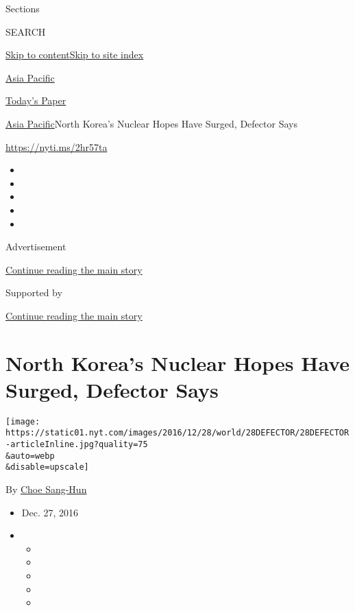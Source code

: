 Sections

SEARCH

\protect\hyperlink{site-content}{Skip to
content}\protect\hyperlink{site-index}{Skip to site index}

\href{https://www.nytimes.com/section/world/asia}{Asia Pacific}

\href{https://myaccount.nytimes.com/auth/login?response_type=cookie\&client_id=vi}{}

\href{https://www.nytimes.com/section/todayspaper}{Today's Paper}

\href{/section/world/asia}{Asia Pacific}\textbar{}North Korea's Nuclear
Hopes Have Surged, Defector Says

\url{https://nyti.ms/2hr57ta}

\begin{itemize}
\item
\item
\item
\item
\item
\end{itemize}

Advertisement

\protect\hyperlink{after-top}{Continue reading the main story}

Supported by

\protect\hyperlink{after-sponsor}{Continue reading the main story}

\hypertarget{north-koreas-nuclear-hopes-have-surged-defector-says}{%
\section{North Korea's Nuclear Hopes Have Surged, Defector
Says}\label{north-koreas-nuclear-hopes-have-surged-defector-says}}

\texttt{[image: https://static01.nyt.com/images/2016/12/28/world/28DEFECTOR/28DEFECTOR-articleInline.jpg?quality=75\\\&auto=webp\\\&disable=upscale]}

By \href{http://www.nytimes.com/by/choe-sang-hun}{Choe Sang-Hun}

\begin{itemize}
\item
  Dec. 27, 2016
\item
  \begin{itemize}
  \item
  \item
  \item
  \item
  \item
  \end{itemize}
\end{itemize}

